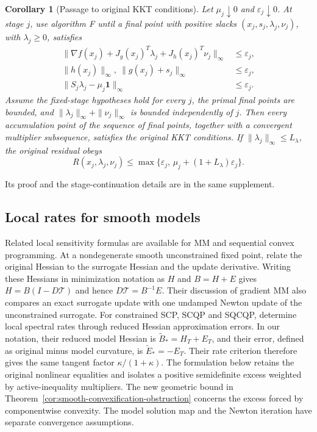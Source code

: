 \documentclass[pdflatex,sn-mathphys-num]{sn-jnl}
\theoremstyle{thmstyleone}
\newtheorem{corollary}[theorem]{Corollary}
\theoremstyle{thmstylethree}
\newcounter{algorithm}
\begin{document}
\begin{corollary}[Passage to original KKT conditions]
\label{cor:filtered-original}
Let $\mu_j\downarrow0$ and $\varepsilon_j\downarrow0$.
At stage $j$, use algorithm F until a final point with positive slacks
$(x_j,s_j,\lambda_j,\nu_j)$, with $\lambda_j\geq0$, satisfies
\begin{equation}
 \begin{split}
 \|\nabla f(x_j)+J_g(x_j)^T\lambda_j+
                      J_h(x_j)^T\nu_j\|_\infty&\leq\varepsilon_j,\\
 \|h(x_j)\|_\infty,\ \|g(x_j)+s_j\|_\infty&\leq\varepsilon_j,\\
 \|S_j\lambda_j-\mu_j\mathbf1\|_\infty&\leq\varepsilon_j .
 \end{split}
 \label{eq:filter-outer-stop}
\end{equation}
Assume the fixed-stage hypotheses hold for every $j$, the primal
final points are bounded, and
$\|\lambda_j\|_\infty+\|\nu_j\|_\infty$ is bounded independently of $j$.
Then every accumulation point of the sequence of final points, together
with a convergent multiplier subsequence, satisfies the original
KKT conditions.
If $\|\lambda_j\|_\infty\leq L_\lambda$, the original residual obeys
\begin{equation}
 R(x_j,\lambda_j,\nu_j)
 \leq \max\{\varepsilon_j,\,
                 \mu_j+(1+L_\lambda)\varepsilon_j\}.
 \label{eq:filter-original-bound}
\end{equation}
\end{corollary}
Its proof and the stage-continuation details are in the same supplement.

\subsection{Local rates for smooth models}
Related local sensitivity formulas are available for MM and sequential
convex programming. At a nondegenerate smooth unconstrained fixed point,
\citet[Section~6.1, equations~(19)--(20)]{HunterLange2004} relate the
original Hessian to the surrogate Hessian and the update derivative.
Writing these Hessians in minimization notation as $H$ and $B=H+E$
gives $H=B(I-D\mathcal T)$ and hence
$D\mathcal T=B^{-1}E$. Their discussion of gradient MM also compares
an exact surrogate update with one undamped Newton update of the
unconstrained surrogate. For constrained SCP, SCQP and SQCQP,
\citet[Theorem~4.5]{MessererBaumgaertnerDiehl2021} determine local
spectral rates through reduced Hessian approximation errors. In our notation, their reduced model Hessian is
$\widetilde B_*=H_T+E_T$, and their error, defined as original minus model
curvature, is $\widetilde E_*=-E_T$. Their rate criterion therefore gives
the same tangent factor $\kappa/(1+\kappa)$.
The formulation below retains the original nonlinear equalities and
isolates a positive semidefinite excess weighted by active-inequality
multipliers. The new geometric bound in
Theorem~\ref{cor:smooth-convexification-obstruction} concerns the excess
forced by componentwise convexity. The model solution map and the
Newton iteration have separate convergence assumptions.
\end{document}
